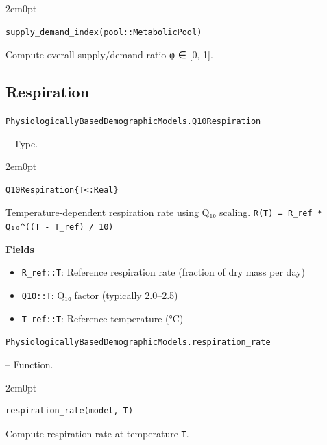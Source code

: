 \begin{adjustwidth}{2em}{0pt}


\begin{verbatim}
supply_demand_index(pool::MetabolicPool)
\end{verbatim}

Compute overall supply/demand ratio φ ∈ [0, 1].



\end{adjustwidth}

\subsection{Respiration}



\label{14496120134399586278}{}

\hypertarget{7171593992136169357}{\texttt{PhysiologicallyBasedDemographicModels.Q10Respiration}}  -- {Type.}

\begin{adjustwidth}{2em}{0pt}


\begin{verbatim}
Q10Respiration{T<:Real}
\end{verbatim}

Temperature-dependent respiration rate using Q₁₀ scaling. \texttt{R(T) = R\_ref * Q₁₀{\textasciicircum}((T - T\_ref) / 10)}

\textbf{Fields}

\begin{itemize}
\item \texttt{R\_ref::T}: Reference respiration rate (fraction of dry mass per day)


\item \texttt{Q10::T}: Q₁₀ factor (typically 2.0–2.5)


\item \texttt{T\_ref::T}: Reference temperature (°C)

\end{itemize}


\end{adjustwidth}
\hypertarget{12901307278820201082}{\texttt{PhysiologicallyBasedDemographicModels.respiration\_rate}}  -- {Function.}

\begin{adjustwidth}{2em}{0pt}


\begin{verbatim}
respiration_rate(model, T)
\end{verbatim}

Compute respiration rate at temperature \texttt{T}.



\end{adjustwidth}

